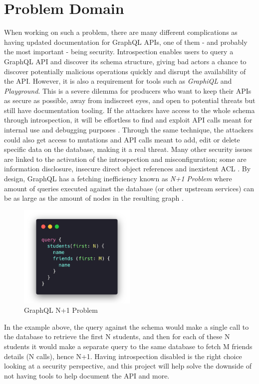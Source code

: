 \section*{Problem Domain}
\label{s:Problem-Domain}
When working on such a problem, there are many different complications as having
updated documentation for GraphQL APIs, one of them - and probably the most
important - being security. Introspection enables users to query a GraphQL API
and discover its schema structure, giving bad actors a chance to discover
potentially malicious operations \citep{khalilWhyYouShould2021} quickly and
disrupt the availability of the API. However, it is also a requirement for tools
such as \textit{GraphiQL} and \textit{Playground}. This is a severe dilemma for
producers who want to keep their APIs as secure as possible, away from
indiscreet eyes, and open to potential threats but still have documentation
tooling. If the attackers have access to the whole schema through introspection,
it will be effortless to find and exploit API calls meant for internal use and
debugging purposes \citep{rizwanGraphQLCommonVulnerabilities2021}. Through the
same technique, the attackers could also get access to mutations and API calls
meant to add, edit or delete specific data on the database, making it a real
threat. Many other security issues are linked to the activation of the
introspection and misconfiguration; some are information disclosure, insecure
direct object references and inexistent ACL \citep{
yeswehackHowExploitGraphQL2021}. By design, GraphQL has a fetching inefficiency
known as \textit{N+1 Problem} where amount of queries executed against the
database (or other upstream services) can be as large as the amount of nodes in
the resulting graph \citep{ graphqlbypopSuppressingProblemGraphQL2020}.
\begin{figure}[H]
  \centering
  \includegraphics[width=0.5\textwidth]{figures/code/n+1}
  \caption{GraphQL N+1 Problem}
  \label{f:GraphQL-N1-Problem}
\end{figure}
In the example above, the query against the schema would make a single call to
the database to retrieve the first N students, and then for each of these N
students it would make a separate query to the same database to fetch M friends
details (N calls), hence N+1. Having introspection disabled is the right choice
looking at a security perspective, and this project will help solve the downside
of not having tools to help document the API and more.

